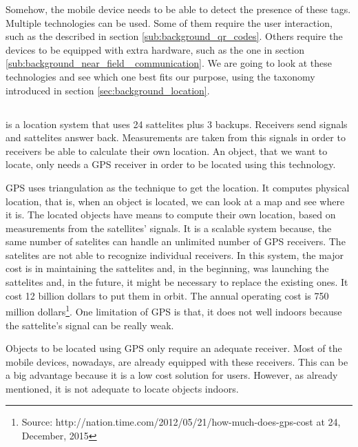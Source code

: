 Somehow, the mobile device needs to be able to detect the presence of these tags.
Multiple technologies can be used.
Some of them require the user interaction, such as the described in section \ref{sub:background_qr_codes}.
Others require the devices to be equipped with extra hardware, such as the one in section \ref{sub:background_near_field _communication}.
We are going to look at these technologies and see which one best fits our purpose, using the taxonomy introduced in section \ref{sec:background_location}.

\subsection{}
\label{sub:background_gps}
 is a location system that uses 24 sattelites plus 3 backups.
Receivers send signals and sattelites answer back. Measurements are taken from this signals in order to receivers be able to calculate their own location.
An object, that we want to locate, only needs a \gls{GPS} receiver in order to be located using this technology.

\gls{GPS} uses triangulation as the technique to get the location.
It computes physical location, that is, when an object is located, we can look at a map and see where it is.
The located objects have means to compute their own location, based on measurements from the satellites' signals.
It is a scalable system because, the same number of satelites can handle an unlimited number of \gls{GPS} receivers.
The satelites are not able to recognize individual receivers.
In this system, the major cost is in maintaining the sattelites and, in the beginning, was launching the sattelites and, in the future, it might be necessary to replace the existing ones.
It cost 12 billion dollars to put them in orbit. The annual operating cost is 750 million dollars\footnote{Source: http://nation.time.com/2012/05/21/how-much-does-gps-cost at 24, December, 2015}.
One limitation of \gls{GPS} is that, it does not well indoors because the sattelite's signal can be really weak.

Objects to be located using \gls{GPS} only require an adequate receiver. Most of the mobile devices, nowadays, are already equipped with these receivers.
This can be a big advantage because it is a low cost solution for users.
However, as already mentioned, it is not adequate to locate objects indoors.

